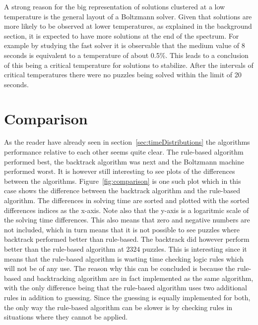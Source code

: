 \documentclass[a4paper,11pt]{kth-mag}
\begin{document}
A strong reason for the big representation of solutions clustered at a low temperature is the general layout of a Boltzmann solver.
Given that solutions are more likely to be observed at lower temperatures, as explained in the background section, it is expected to have more solutions at the end of the spectrum.
For example by studying the fast solver it is observable that the medium value of 8 seconds is equivalent to a temperature of about 0.5\%.
This leads to a conclusion of this being a critical temperature for solutions to stabilize.
After the intervals of critical temperatures there were no puzzles being solved within the limit of 20 seconds.

\FloatBarrier
\section{Comparison}
\label{sec:comparisonAnalysis}
As the reader have already seen in section~\ref{sec:timeDistributions} the algorithms performance relative to each other seems quite clear.
The rule-based algorithm performed best, the backtrack algorithm was next and the Boltzmann machine performed worst.
It is however still interesting to see plots of the differences between the algorithms.
Figure~\ref{fig:comparison} is one such plot which in this case shows the difference between the backtrack algorithm and the rule-based algorithm. The differences in solving time are sorted and plotted with the sorted differences indices as the x-axis. Note also that the y-axis is a logaritmic scale of the solving time differences.
This also means that zero and negative numbers are not included, which in turn means that it is not possible to see puzzles where backtrack performed better than rule-based.
The backtrack did however perform better than the rule-based algorithm at $2324$ puzzles.
This is interesting since it means that the rule-based algorithm is wasting time checking logic rules which will not be of any use.
The reason why this can be concluded is because the rule-based and backtracking algorithm are in fact implemented as the same algorithm, with the only difference being that the rule-based algorithm uses two additional rules in addition to guessing.
Since the guessing is equally implemented for both, the only way the rule-based algorithm can be slower is by checking rules in situations where they cannot be applied.
\\
\end{document}
